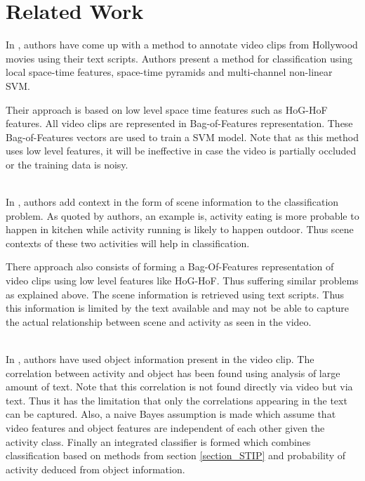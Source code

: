 \chapter{Related Work}

\label{ch3_RELATED}

In \cite{Realistic}, authors have come up with a method to annotate video clips 
from Hollywood movies using their text scripts.
Authors present a method for classification using local space-time features, 
space-time pyramids and multi-channel non-linear SVM. 

Their approach is based on low level space time features such as HoG-HoF features. 
All video clips are represented in Bag-of-Features representation. 
These Bag-of-Features vectors are used to train a SVM model. 
Note that as this method uses low level features, it will be ineffective 
in case the video is partially occluded or the training data is noisy.

~\\
In \cite{actionsInContext}, authors add context in the form of scene information to the classification problem. 
As quoted by authors, an example is, activity eating is more probable to happen in kitchen 
while activity running is likely to happen outdoor. Thus scene contexts of these two activities will help in classification.

There approach also consists of forming a Bag-Of-Features representation of video clips
using low level features like HoG-HoF. Thus suffering similar problems as explained above. 
The scene information is retrieved using text scripts.
Thus this information is limited by the text available 
and may not be able to capture the actual relationship between
scene and activity as seen in the video.

~\\
In \cite{improving}, authors have used object information present in the video clip. 
The correlation between activity and object has been found using analysis of large amount of text. 
Note that this correlation is not found directly via video but via text.
Thus it has the limitation that only the correlations appearing in the text can be captured.
Also, a naive Bayes assumption is made which assume that video features 
and object features are independent of each other given the activity class.
Finally an integrated classifier is formed which combines classification based on methods from section \ref{section_STIP} 
and probability of activity deduced from object information.

